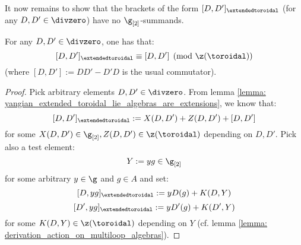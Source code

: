         It now remains to show that the brackets of the form $[D, D']_{\extendedtoroidal}$ (for any $D, D' \in \divzero$) have no $\g_{[2]}$-summands.
        \begin{proposition} \label{prop: appearance_of_toroidal_cocycles}
            For any $D, D' \in \divzero$, one has that:
                $$[D, D']_{\extendedtoroidal} \equiv [D, D'] \pmod{\z(\toroidal)}$$
            (where $[D, D'] := DD' - D'D$ is the usual commutator).
        \end{proposition}
            \begin{proof}
                Pick arbitrary elements $D, D' \in \divzero$. From lemma \ref{lemma: yangian_extended_toroidal_lie_algebras_are_extensions}, we know that:
                    $$[D, D']_{\extendedtoroidal} := X(D, D') + Z(D, D') + [D, D']$$
                for some $X(D, D') \in \g_{[2]}, Z(D, D') \in \z(\toroidal)$ depending on $D, D'$. Pick also a test element:
                    $$Y := yg \in \g_{[2]}$$
                for some arbitrary $y \in \g$ and $g \in A$ and set:
                    $$[D, y g]_{\extendedtoroidal} := y D( g ) + K(D, Y)$$
                    $$[D', y g]_{\extendedtoroidal} := y D'( g ) + K(D', Y)$$
                for some $K(D, Y) \in \z(\toroidal)$ depending on $Y$ (cf. lemma \ref{lemma: derivation_action_on_multiloop_algebras}).
                

\end{proof}
